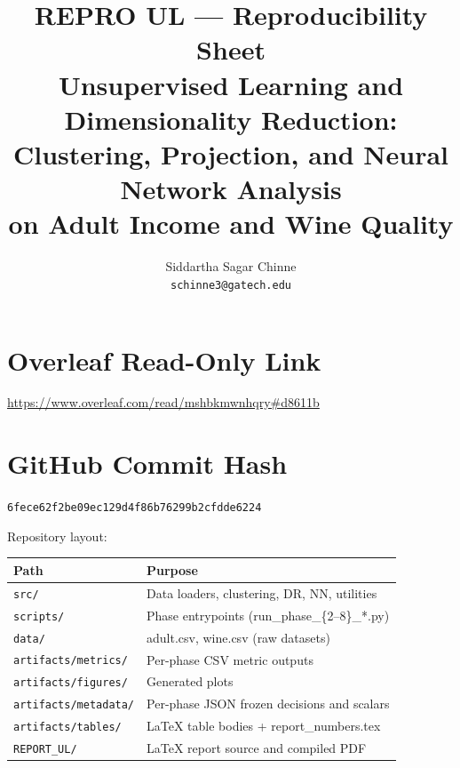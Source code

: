 \documentclass[letterpaper, 11pt]{article}
\title{REPRO UL --- Reproducibility Sheet\\[4pt]
\large Unsupervised Learning and Dimensionality Reduction:\\
Clustering, Projection, and Neural Network Analysis\\
on Adult Income and Wine Quality}
\author{Siddartha Sagar Chinne \\ \texttt{schinne3@gatech.edu}}
\date{}
\begin{document}
\maketitle
\thispagestyle{empty}
\pagestyle{empty}

\section{Overleaf Read-Only Link}

\begin{center}
\url{https://www.overleaf.com/read/mshbkmwnhqry#d8611b}
\end{center}

\section{GitHub Commit Hash}

\begin{center}
\texttt{6fece62f2be09ec129d4f86b76299b2cfdde6224}
\end{center}

Repository layout:

\medskip
\begin{center}
\begin{tabular}{@{}ll@{}}
\toprule
Path & Purpose \\
\midrule
\texttt{src/}                        & Data loaders, clustering, DR, NN, utilities \\
\texttt{scripts/}                    & Phase entrypoints (run\_phase\_\{2--8\}\_*.py) \\
\texttt{data/}                       & adult.csv, wine.csv (raw datasets) \\
\texttt{artifacts/metrics/}          & Per-phase CSV metric outputs \\
\texttt{artifacts/figures/}          & Generated plots \\
\texttt{artifacts/metadata/}         & Per-phase JSON frozen decisions and scalars \\
\texttt{artifacts/tables/}           & LaTeX table bodies + report\_numbers.tex \\
\texttt{REPORT\_UL/}                 & LaTeX report source and compiled PDF \\
\bottomrule
\end{tabular}
\end{center}
\end{document}

